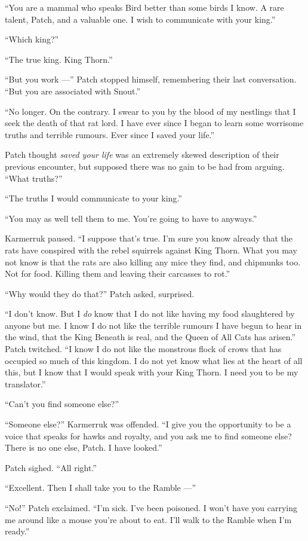 \documentclass[12pt]{memoir}
\begin{document}
“You are a mammal who speaks Bird better than some birds I know. A
rare talent, Patch, and a valuable one. I wish to communicate with
your king.”

“Which king?”

“The true king. King Thorn.”

“But you work —” Patch stopped himself, remembering their last
conversation. “But you are associated with Snout.”

“No longer. On the contrary. I swear to you by the blood of my
nestlings that I seek the death of that rat lord. I have ever since I
began to learn some worrisome truths and terrible rumours. Ever since
I saved your life.”

Patch thought \textit{saved your life} was an extremely skewed
description of their previous encounter, but supposed there was no
gain to be had from arguing. “What truths?”

“The truths I would communicate to your king.”

“You may as well tell them to me. You’re going to have to anyways.”

Karmerruk paused. “I suppose that’s true. I’m sure you know already
that the rats have conspired with the rebel squirrels against King
Thorn. What you may not know is that the rats are also killing any
mice they find, and chipmunks too. Not for food. Killing them and
leaving their carcasses to rot.”

“Why would they do that?” Patch asked, surprised.

“I don’t know. But I \textit{do} know that I do not like having my
food slaughtered by anyone but me. I know I do not like the terrible
rumours I have begun to hear in the wind, that the King Beneath is
real, and the Queen of All Cats has arisen.” Patch twitched. “I know I
do not like the monstrous flock of crows that has occupied so much of
this kingdom. I do not yet know what lies at the heart of all this,
but I know that I would speak with your King Thorn. I need you to be
my translator.”

“Can’t you find someone else?”

“Someone else?” Karmerruk was offended. “I give you the opportunity to
be a voice that speaks for hawks and royalty, and you ask me to find
someone else? There is no one else, Patch. I have looked.”

Patch sighed. “All right.”

“Excellent. Then I shall take you to the Ramble —”

“No!” Patch exclaimed. “I’m sick. I’ve been poisoned. I won’t have you
carrying me around like a mouse you’re about to eat. I’ll walk to the
Ramble when I’m ready.”
\end{document}
